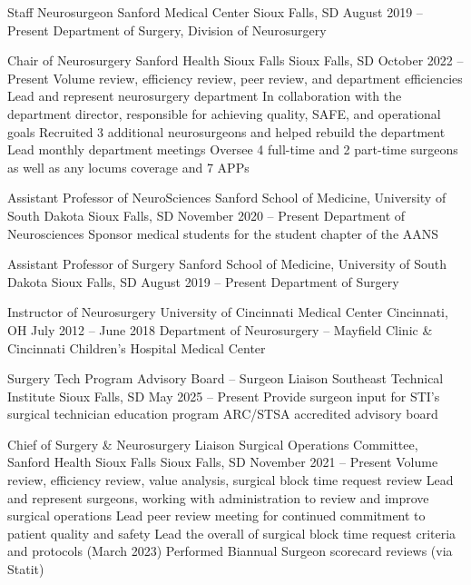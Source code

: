 \documentclass[11pt, a4paper, sans]{moderncv}
\begin{document}
\cventry%
  {Staff Neurosurgeon}%
  {Sanford Medical Center}%
  {Sioux Falls, SD}%
  {August 2019 -- Present}%
  {Department of Surgery, Division of Neurosurgery}

\cventry%
  {Chair of Neurosurgery}%
  {Sanford Health Sioux Falls}%
  {Sioux Falls, SD}%
  {October 2022 -- Present}%
  {Volume review, efficiency review, peer review, and department efficiencies \textbullet{} Lead and represent neurosurgery department \textbullet{} In collaboration with the department director, responsible for achieving quality, SAFE, and operational goals \textbullet{} Recruited 3 additional neurosurgeons and helped rebuild the department \textbullet{} Lead monthly department meetings \textbullet{} Oversee 4 full-time and 2 part-time surgeons as well as any locums coverage and 7 APPs}

\cventry%
  {Assistant Professor of NeuroSciences}%
  {Sanford School of Medicine, University of South Dakota}%
  {Sioux Falls, SD}%
  {November 2020 -- Present}%
  {Department of Neurosciences \textbullet{} Sponsor medical students for the student chapter of the AANS}

\cventry%
  {Assistant Professor of Surgery}%
  {Sanford School of Medicine, University of South Dakota}%
  {Sioux Falls, SD}%
  {August 2019 -- Present}%
  {Department of Surgery}

\cventry%
  {Instructor of Neurosurgery}%
  {University of Cincinnati Medical Center}%
  {Cincinnati, OH}%
  {July 2012 -- June 2018}%
  {Department of Neurosurgery -- Mayfield Clinic \& Cincinnati Children's Hospital Medical Center}

\cventry%
  {Surgery Tech Program Advisory Board -- Surgeon Liaison}%
  {Southeast Technical Institute}%
  {Sioux Falls, SD}%
  {May 2025 -- Present}%
  {Provide surgeon input for STI's surgical technician education program \textbullet{} ARC/STSA accredited advisory board}

\cventry%
  {Chief of Surgery \& Neurosurgery Liaison}%
  {Surgical Operations Committee, Sanford Health Sioux Falls}%
  {Sioux Falls, SD}%
  {November 2021 -- Present}%
  {Volume review, efficiency review, value analysis, surgical block time request review \textbullet{} Lead and represent surgeons, working with administration to review and improve surgical operations \textbullet{} Lead peer review meeting for continued commitment to patient quality and safety \textbullet{} Lead the overall of surgical block time request criteria and protocols (March 2023) \textbullet{} Performed Biannual Surgeon scorecard reviews (via Statit)}
\end{document}
